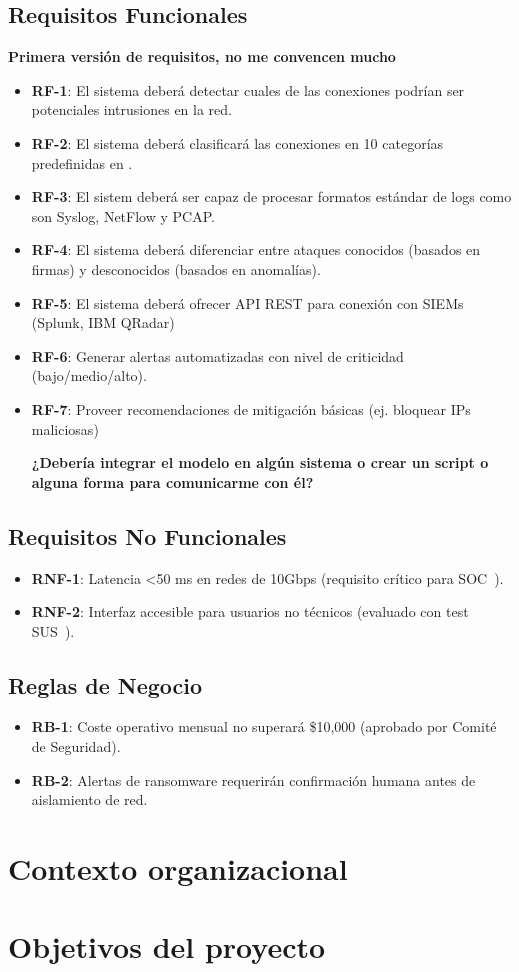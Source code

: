 \subsection{Requisitos Funcionales}   \label{sec.req-funcionales}
\textbf{Primera versión de requisitos, no me convencen mucho}
\begin{itemize}  
    \item \textbf{RF-1}: El sistema deberá detectar cuales de las conexiones podrían ser potenciales intrusiones en la red.
    \item \textbf{RF-2}: El sistema deberá clasificará las conexiones en 10 categorías predefinidas en .  
	\item \textbf{RF-3}: El sistem deberá ser capaz de procesar formatos estándar de logs como son Syslog, NetFlow y PCAP.
	\item \textbf{RF-4}: El sistema deberá diferenciar entre ataques conocidos (basados en firmas) y desconocidos (basados en anomalías).
	\item \textbf{RF-5}: El sistema deberá ofrecer API REST para conexión con SIEMs (Splunk, IBM QRadar)
	\item \textbf{RF-6}: Generar alertas automatizadas con nivel de criticidad (bajo/medio/alto).
	\item \textbf{RF-7}: Proveer recomendaciones de mitigación básicas (ej. bloquear IPs maliciosas)

	
	
\textbf{¿Debería integrar el modelo en algún sistema o crear un script o alguna forma para comunicarme con él?}
		
\end{itemize}  

\subsection{Requisitos No Funcionales}   \label{sec.req-no-funcionales}
\begin{itemize}  
    \item \textbf{RNF-1}: Latencia <50 ms en redes de 10Gbps (requisito crítico para SOC~\cite{nist2021ai}).  
    \item \textbf{RNF-2}: Interfaz accesible para usuarios no técnicos (evaluado con test SUS~\cite{brooke1996sus}).  
\end{itemize}  

\subsection{Reglas de Negocio}   \label{sec.reglas-neogcio}
\begin{itemize}  
    \item \textbf{RB-1}: Coste operativo mensual no superará \$10,000 (aprobado por Comité de Seguridad).  
    \item \textbf{RB-2}: Alertas de ransomware requerirán confirmación humana antes de aislamiento de red.  
\end{itemize}  
\section{Contexto organizacional} \label{sec.contexto-organizacional}


\section{Objetivos del proyecto}